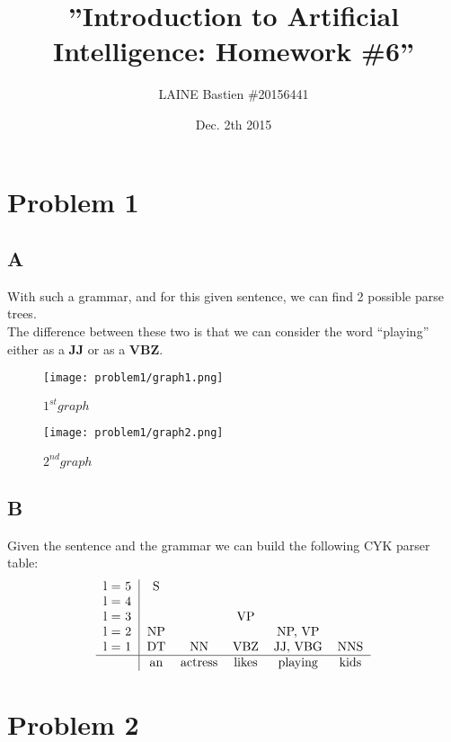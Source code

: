 \documentclass{article}
\begin{document}
\title{\textbf{''Introduction to Artificial Intelligence: Homework \#6''}}
\author{LAINE Bastien \#20156441}
\date{Dec. 2th 2015}
\maketitle
\tableofcontents

\newpage
    \section{Problem 1}
        \subsection{A}
            With such a grammar, and for this given sentence, we can find 2 possible parse trees.\\
            The difference between these two is that we can consider the word ``playing'' either as a \textbf{JJ} or as a \textbf{VBZ}.
            \begin{figure}[H]
                \centering
                \texttt{[image: problem1/graph1.png]}
                \caption{$1^{st} graph$}
            \end{figure}
            \begin{figure}[H]
                \centering
                \texttt{[image: problem1/graph2.png]}
                \caption{$2^{nd} graph$}
            \end{figure}
        \subsection{B}
            Given the sentence and the grammar we can build the following CYK parser table:
            \[
                \begin{tabular}{r|ccccccccc}
                    l = 5 & S\\
                    l = 4 &  &\\
                    l = 3 &  &  & VP\\
                    l = 2 & NP &  &  & NP, VP\\
                    l = 1 & DT & NN & VBZ & JJ, VBG & NNS \\
                    \hline
                    & an & actress & likes & playing & kids \\
                \end{tabular}
            \]
    \newpage
    \section{Problem 2}
\end{document}
